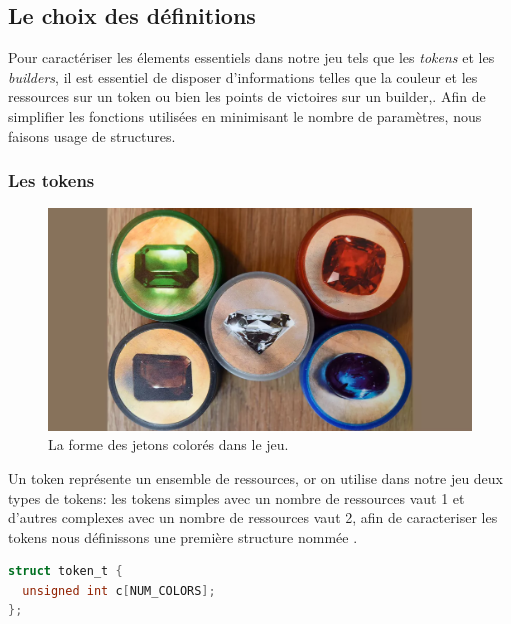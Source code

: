 \documentclass{article}
\begin{document}

\subsection{Le choix des définitions}

\vspace{1em}


\hspace{1em}Pour caractériser les élements essentiels dans notre jeu tels que les \emph{tokens} et les \emph{builders}, il est essentiel de disposer d'informations telles que la couleur et les ressources sur un token ou bien les points de victoires  sur un builder,. Afin de simplifier les fonctions utilisées en minimisant le nombre de paramètres, nous faisons usage de structures.

\subsubsection{Les tokens}

\begin{figure}[ht]
    \centering
    \includegraphics[width=0.5\linewidth]{tokens.png}
    \caption{La forme des jetons colorés dans le jeu.}
    \label{fig: LA FORME DES TOKENS  }
\end{figure}


\hspace{1em} Un token représente un ensemble de ressources, or on utilise dans notre jeu deux types  de tokens: les tokens simples avec un nombre de ressources vaut 1 et d'autres complexes avec un nombre de ressources vaut 2, afin de caracteriser les tokens nous définissons une première structure nommée .


\begin{tcolorbox}[colback=gray!10,colframe=white!75!black]

\begin{lstlisting}[language=C, caption={La structure caracterisant un  Token}, 
label={lst:exemple19-c}]
struct token_t {
  unsigned int c[NUM_COLORS];
};
\end{lstlisting}
\end{tcolorbox}
\end{document}
